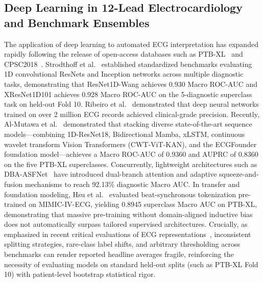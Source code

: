\documentclass[5p,twocolumn,10pt]{elsarticle}
\begin{document}
\subsection{Deep Learning in 12-Lead Electrocardiology and Benchmark Ensembles}
The application of deep learning to automated ECG interpretation has expanded rapidly following the release of open-access databases such as PTB-XL~\cite{wagner2020ptb} and CPSC2018~\cite{liu2018open}. Strodthoff et al.~\cite{strodthoff2020deep} established standardized benchmarks evaluating 1D convolutional ResNets and Inception networks across multiple diagnostic tasks, demonstrating that ResNet1D-Wang achieves 0.930 Macro ROC-AUC and XResNet1D101 achieves 0.928 Macro ROC-AUC on the 5-diagnostic superclass task on held-out Fold 10. Ribeiro et al.~\cite{ribeiro2020automatic} demonstrated that deep neural networks trained on over 2 million ECG records achieved clinical-grade precision. Recently, Al-Mutawa et al.~\cite{al2026stacking} demonstrated that stacking diverse state-of-the-art sequence models---combining 1D-ResNet18, Bidirectional Mamba, xLSTM, continuous wavelet transform Vision Transformers (CWT-ViT-KAN), and the ECGFounder foundation model---achieves a Macro ROC-AUC of 0.9360 and AUPRC of 0.8360 on the five PTB-XL superclasses. Concurrently, lightweight architectures such as DBA-ASFNet~\cite{dba_asfnet2024} have introduced dual-branch attention and adaptive squeeze-and-fusion mechanisms to reach 92.13\% diagnostic Macro AUC. In transfer and foundation modeling, Hsu et al.~\cite{mimic_ptbxl2026} evaluated beat-synchronous tokenization pre-trained on MIMIC-IV-ECG, yielding 0.8945 superclass Macro AUC on PTB-XL, demonstrating that massive pre-training without domain-aligned inductive bias does not automatically surpass tailored supervised architectures. Crucially, as emphasized in recent critical evaluations of ECG representations~\cite{goldberger2026ecgfix}, inconsistent splitting strategies, rare-class label shifts, and arbitrary thresholding across benchmarks can render reported headline averages fragile, reinforcing the necessity of evaluating models on standard held-out splits (such as PTB-XL Fold 10) with patient-level bootstrap statistical rigor.
\end{document}
